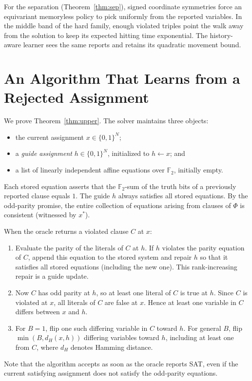 \documentclass[11pt,a4paper]{article}
\theoremstyle{definition}
\theoremstyle{remark}
\newcommand{\F}{\mathbb{F}}
\begin{document}
For the separation (Theorem~\ref{thm:sep}), signed coordinate symmetries force an equivariant memoryless policy to pick uniformly from the reported variables. In the middle band of the hard family, enough violated triples point the walk away from the solution to keep its expected hitting time exponential. The history-aware learner sees the same reports and retains its quadratic movement bound.

\section{An Algorithm That Learns from a Rejected Assignment}\label{sec:upper}

We prove Theorem~\ref{thm:upper}. The solver maintains three objects:
\begin{itemize}
    \item the current assignment $x \in \{0,1\}^N$;
    \item a \emph{guide assignment} $h \in \{0,1\}^N$, initialized to $h \leftarrow x$; and
    \item a list of linearly independent affine equations over $\F_2$, initially empty.
\end{itemize}
Each stored equation asserts that the $\F_2$-sum of the truth bits of a previously reported clause equals $1$. The guide $h$ always satisfies all stored equations. By the odd-parity promise, the entire collection of equations arising from clauses of $\Phi$ is consistent (witnessed by $x^*$).

When the oracle returns a violated clause $C$ at $x$:
\begin{enumerate}
    \item Evaluate the parity of the literals of $C$ at $h$. If $h$ violates the parity equation of $C$, append this equation to the stored system and repair $h$ so that it satisfies all stored equations (including the new one). This rank-increasing repair is a guide update.
    \item Now $C$ has odd parity at $h$, so at least one literal of $C$ is true at $h$. Since $C$ is violated at $x$, all literals of $C$ are false at $x$. Hence at least one variable in $C$ differs between $x$ and $h$.
    \item For $B=1$, flip one such differing variable in $C$ toward $h$. For general $B$, flip $\min(B, d_H(x,h))$ differing variables toward $h$, including at least one from $C$, where $d_H$ denotes Hamming distance.
\end{enumerate}
Note that the algorithm accepts as soon as the oracle reports \textsc{SAT}, even if the current satisfying assignment does not satisfy the odd-parity equations.
\end{document}
